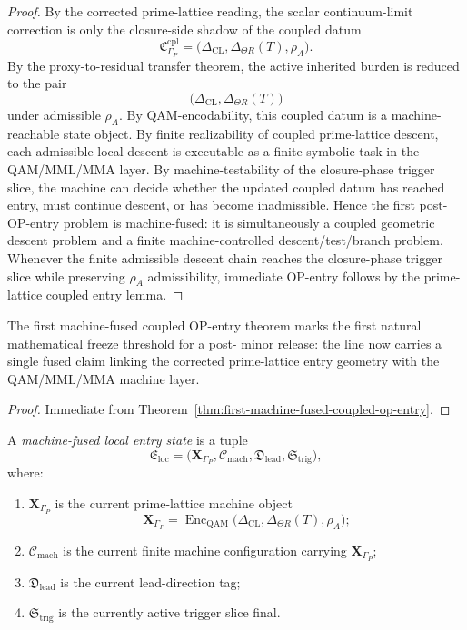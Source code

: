 \begin{proof}
By the corrected prime-lattice reading, the scalar continuum-limit correction is only the closure-side shadow of the coupled datum
\[
 \mathfrak{C}_{\Gamma_P}^{\mathrm{cpl}}
 =
 \bigl(\Delta_{\mathrm{CL}},\Delta_{\Theta R}(T),\rho_A\bigr).
\]
By the proxy-to-residual transfer theorem, the active inherited burden is reduced to the pair
\[
 \bigl(\Delta_{\mathrm{CL}},\Delta_{\Theta R}(T)\bigr)
\]
under admissible $\rho_A$.
By QAM-encodability, this coupled datum is a machine-reachable state object.
By finite realizability of coupled prime-lattice descent, each admissible local descent is executable as a finite symbolic task in the QAM/MML/MMA layer.
By machine-testability of the closure-phase trigger slice, the machine can decide whether the updated coupled datum has reached entry, must continue descent, or has become inadmissible.
Hence the first post- OP-entry problem is machine-fused: it is simultaneously a coupled geometric descent problem and a finite machine-controlled descent/test/branch problem.
Whenever the finite admissible descent chain reaches the closure-phase trigger slice while preserving $\rho_A$ admissibility, immediate OP-entry follows by the prime-lattice coupled entry lemma.
\end{proof}

\begin{corollary}
\label{cor:first-post-v3310-freeze-threshold}
The first machine-fused coupled OP-entry theorem marks the first natural mathematical freeze threshold for a post- minor release: the line now carries a single fused claim linking the corrected prime-lattice entry geometry with the QAM/MML/MMA machine layer.
\end{corollary}

\begin{proof}
Immediate from Theorem~\ref{thm:first-machine-fused-coupled-op-entry}.
\end{proof}


\begin{definition}
\label{def:machine-fused-local-entry-state}
A \emph{machine-fused local entry state} is a tuple
\[
\mathfrak{E}_{\mathrm{loc}}
=
\bigl(
\mathbf{X}_{\Gamma_P},
\mathcal{C}_{\mathrm{mach}},
\mathfrak{D}_{\mathrm{lead}},
\mathfrak{S}_{\mathrm{trig}}
\bigr),
\]
where:
\begin{enumerate}
 \item $\mathbf{X}_{\Gamma_P}$ is the current prime-lattice machine object
 \[
 \mathbf{X}_{\Gamma_P}
 =
 \operatorname{Enc}_{\mathrm{QAM}}
 \bigl(
 \Delta_{\mathrm{CL}},
 \Delta_{\Theta R}(T),
 \rho_A
 \bigr);
 \]
 \item $\mathcal{C}_{\mathrm{mach}}$ is the current finite machine configuration carrying $\mathbf{X}_{\Gamma_P}$;
 \item $\mathfrak{D}_{\mathrm{lead}}$ is the current lead-direction tag;
 \item $\mathfrak{S}_{\mathrm{trig}}$ is the currently active trigger slice final.
\end{enumerate}
\end{definition}

